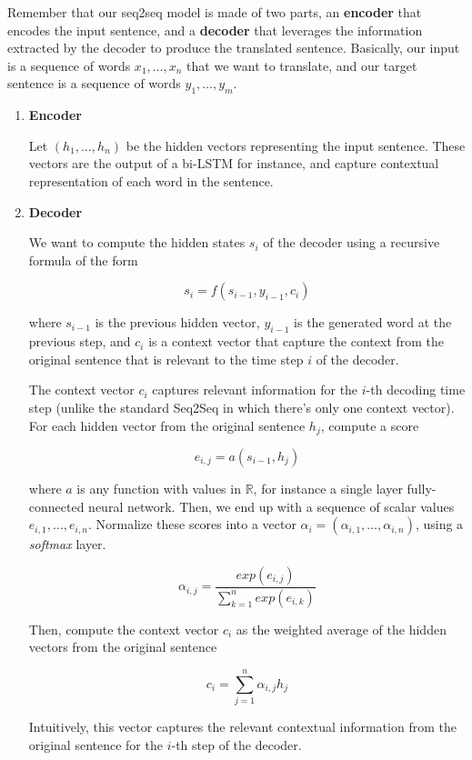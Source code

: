 \documentclass{tufte-handout}
\begin{document}
Remember that our seq2seq model is made of two parts, an \textbf{encoder} that encodes the input sentence, and a \textbf{decoder} that leverages the information extracted by the decoder to produce the translated sentence. Basically, our input is a sequence of words $ x_1, \ldots, x_n $ that we want to translate, and our target sentence is a sequence of words $ y_1, \ldots, y_m $. 

\begin{enumerate}
\item \textbf{Encoder}

Let $ (h_1, \ldots, h_n) $ be the hidden vectors representing the input sentence. These vectors are the output of a bi-LSTM for instance, and capture contextual representation of each word in the sentence.
\item \textbf{Decoder}

We want to compute the hidden states $ s_i $ of the decoder using a recursive formula of the form

$$ s_i = f(s_{i-1}, y_{i-1}, c_i) $$

where $ s_{i-1} $ is the previous hidden vector, $ y_{i-1}$ is the generated word at the previous step, and $ c_i $ is a context vector that capture the context from the original sentence that is relevant to the time step $ i $ of the decoder. 


The context vector $c_i$ captures relevant information for the $i$-th decoding time step (unlike the standard Seq2Seq in which there's only one context vector). For each hidden vector from the original sentence $ h_j $, compute a score 

$$ e_{i,j} = a(s_{i-1}, h_j) $$

where $ a $ is any function with values in $ \mathbb{R}$, for instance a single layer fully-connected neural network. Then, we end up with a sequence of scalar values $ e_{i, 1}, \ldots, e_{i, n}$. Normalize these scores into a vector $ \alpha_i = (\alpha_{i,1}, \ldots, \alpha_{i,n}) $, using a \emph{softmax} layer.

$$ \alpha_{i,j} = \frac{exp(e_{i,j})}{\sum_{k=1}^n exp(e_{i,k})} $$

Then, compute the context vector $ c_i $ as the weighted average of the hidden vectors from the original sentence

$$ c_i = \sum_{j=1}^n \alpha_{i,j} h_j $$

Intuitively, this vector captures the relevant contextual information from the original sentence for the $i $-th step of the decoder.

\end{enumerate}
\end{document}
